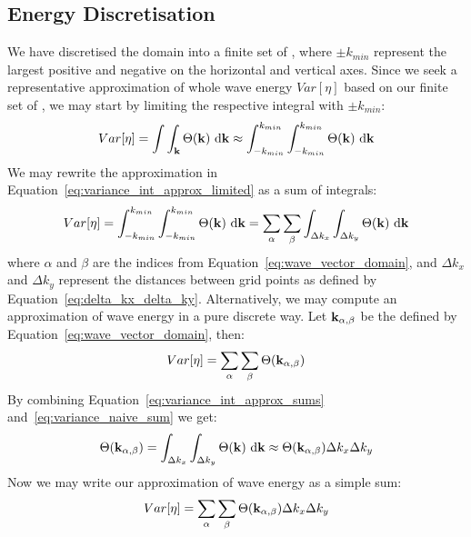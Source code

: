 \subsection{Energy Discretisation}
%
We have discretised the \wavevector domain into a finite set of \wavevectors, 
where $\pm k_{min}$ represent the largest positive and negative \wavenumbers on 
the horizontal and vertical axes. Since we seek a representative approximation 
of whole wave energy $Var[\eta]$ based on our finite set of \wavevectors, we may 
start by limiting the respective integral with $\pm k_{min}$:
\begin{equation}
\label{eq:variance_int_approx_limited}
Var[\eta] = \int\int_{\mathbf{k}}\Theta(\mathbf{k})~\mathrm{d}\mathbf{k}
\approx\int_{-k_{min}}^{k_{min}}\int_{-k_{min}}^{k_{min}}\Theta(\mathbf{k}
)~\mathrm{d}\mathbf{k}
\end{equation}
We may rewrite the approximation in 
Equation~\ref{eq:variance_int_approx_limited} as a sum of integrals:
%
\begin{equation}
\label{eq:variance_int_approx_sums}
 Var[\eta] = \int_{-k_{min}}^{k_{min}}\int_{-k_{min}}^{k_{min}}\Theta(\mathbf{k}
)~\mathrm{d}\mathbf{k} = \sum_{\alpha}\sum_{\beta}\int_{\Delta k_x}\int_{\Delta 
k_y}\Theta(\mathbf{k})~\mathrm{d}\mathbf{k}
\end{equation}
%
where $\alpha$ and $\beta$ are the indices from 
Equation~\ref{eq:wave_vector_domain}, and $\Delta k_x$ and $\Delta k_y$ 
represent the distances between grid points as defined by 
Equation~\ref{eq:delta_kx_delta_ky}. Alternatively, we may compute an 
approximation of wave energy in a pure discrete way. Let 
$\mathbf{k}_{\alpha,\beta}$ be the \wavevectors defined by 
Equation~\ref{eq:wave_vector_domain}, then:
%
\begin{equation}
\label{eq:variance_naive_sum}
 Var[\eta] = \sum_{\alpha}\sum_{\beta}\Theta(\mathbf{k}_{\alpha,\beta})
\end{equation}
%
By combining Equation~\ref{eq:variance_int_approx_sums} 
and~\ref{eq:variance_naive_sum} we get:
%
\begin{equation}
 \Theta(\mathbf{k}_{\alpha,\beta}) = \int_{\Delta k_x}\int_{\Delta 
k_y}\Theta(\mathbf{k})~\mathrm{d}\mathbf{k} \approx 
\Theta(\mathbf{k}_{\alpha,\beta})\Delta k_x\Delta k_y
\end{equation}
Now we may write our approximation of wave energy as a simple sum:
\begin{equation}
\label{eq:variance_discrete}
 Var[\eta] = \sum_{\alpha}\sum_{\beta}\Theta(\mathbf{k}_{\alpha,\beta})\Delta k_x 
\Delta k_y
\end{equation}
%
